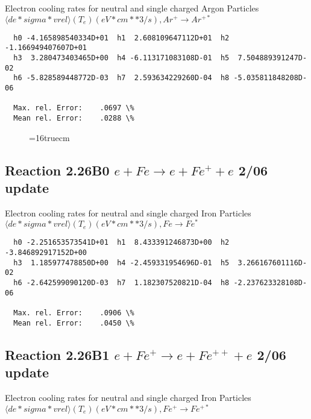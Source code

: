 \documentclass[12pt,dvipdfmx]{article}
\begin{document}
{  Electron cooling rates for neutral and single
  charged Argon Particles
 $  \langle de*sigma*vrel \rangle(T_e)  (eV*cm**3/s), Ar^+ \rightarrow Ar^{+*} $

\begin{small}\begin{verbatim}
  h0 -4.165898540334D+01  h1  2.608109647112D+01  h2 -1.166949407607D+01
  h3  3.280473403465D+00  h4 -6.113171083108D-01  h5  7.504889391247D-02
  h6 -5.828589448772D-03  h7  2.593634229260D-04  h8 -5.035811848208D-06

  Max. rel. Error:    .0697 \%
  Mean rel. Error:    .0288 \%

\end{verbatim}\end{small}

\begin{figure} \label{2.18Bl}
\epsfxsize=16truecm
\end{figure}
\newpage


\subsection{
Reaction 2.26B0 $e + Fe  \rightarrow e + Fe^+  + e$ 2/06 update
}

  Electron cooling rates for neutral and single
  charged Iron Particles
 $ \langle de*sigma*vrel \rangle(T_e)  (eV*cm**3/s), Fe  \rightarrow Fe^* $

\begin{small}\begin{verbatim}
  h0 -2.251653573541D+01  h1  8.433391246873D+00  h2 -3.846892917152D+00
  h3  1.185977478850D+00  h4 -2.459331954696D-01  h5  3.266167601116D-02
  h6 -2.642599090120D-03  h7  1.182307520821D-04  h8 -2.237623328108D-06

  Max. rel. Error:    .0906 \%
  Mean rel. Error:    .0450 \%

\end{verbatim}\end{small}


\subsection{
Reaction 2.26B1 $e + Fe^+ \rightarrow e + Fe^{++} + e$ 2/06 update
}

  Electron cooling rates for neutral and single
  charged Iron Particles
 $  \langle de*sigma*vrel \rangle(T_e)  (eV*cm**3/s), Fe^+ \rightarrow Fe^{+*} $

}
\end{document}
